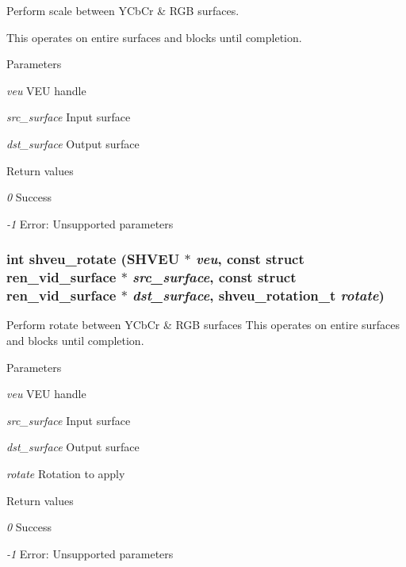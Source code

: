 Perform scale between YCbCr \& RGB surfaces. 

This operates on entire surfaces and blocks until completion.


\begin{DoxyParams}{Parameters}
\item[{\em veu}]VEU handle \item[{\em src\_\-surface}]Input surface \item[{\em dst\_\-surface}]Output surface \end{DoxyParams}

\begin{DoxyRetVals}{Return values}
\item[{\em 0}]Success \item[{\em -\/1}]Error: Unsupported parameters \end{DoxyRetVals}
\subsubsection[{shveu\_\-rotate}]{\setlength{\rightskip}{0pt plus 5cm}int shveu\_\-rotate (SHVEU $\ast$ {\em veu}, \/  const struct {\bf ren\_\-vid\_\-surface} $\ast$ {\em src\_\-surface}, \/  const struct {\bf ren\_\-vid\_\-surface} $\ast$ {\em dst\_\-surface}, \/  {\bf shveu\_\-rotation\_\-t} {\em rotate})}\label{veu__colorspace_8h_a7cd4f9f903ae12ac3b15525611c2aec6}


Perform rotate between YCbCr \& RGB surfaces This operates on entire surfaces and blocks until completion. 


\begin{DoxyParams}{Parameters}
\item[{\em veu}]VEU handle \item[{\em src\_\-surface}]Input surface \item[{\em dst\_\-surface}]Output surface \item[{\em rotate}]Rotation to apply \end{DoxyParams}

\begin{DoxyRetVals}{Return values}
\item[{\em 0}]Success \item[{\em -\/1}]Error: Unsupported parameters \end{DoxyRetVals}
